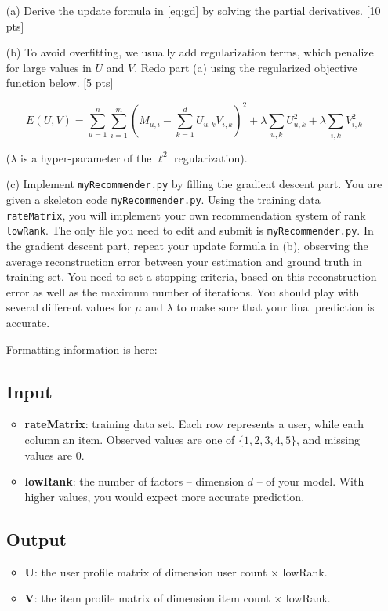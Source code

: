 \documentclass[12pt]{article}
\begin{document}
\begin{itemize}
	\item[(a)] Derive the update formula in \eqref{eq:gd} by
solving the partial derivatives. [10 pts]

\item[(b)] To avoid overfitting, we usually add regularization terms, which penalize for large values in $U$ and $V$.
Redo part (a) using the regularized objective function below. [5
pts]

\begin{equation}
	E(U,V) = \sum_{u=1}^n\sum_{i=1}^m (M_{u,i} - \sum_{k=1}^d U_{u,k}
V_{i,k})^2 + \lambda \sum_{u,k} U_{u,k}^2 + \lambda \sum_{i,k}
V_{i,k}^2 \nonumber
\end{equation}

($\lambda$ is a hyper-parameter of the $\ell^2$ regularization).

\item[(c)] Implement \texttt{myRecommender.py} by filling the gradient descent part.
You are given a skeleton code \texttt{myRecommender.py}. Using the
training data \texttt{rateMatrix}, you will implement your own
recommendation system of rank \texttt{lowRank}. The only file you
need to edit and submit is \texttt{myRecommender.py}. In the gradient descent
part, repeat your update formula in (b), observing the average
reconstruction error between your estimation and ground truth in
training set. You need to set a stopping criteria, based on this
reconstruction error as well as the maximum number of iterations.
You should play with several different values for $\mu$ and
$\lambda$ to make sure that your final prediction is accurate.

Formatting information is here:

\subsection{Input}
\begin{itemize}
  \item \textbf{rateMatrix}: training data set. Each row represents a user, while each column an item.
  Observed values are one of $\{1,2,3,4,5\}$, and missing values are
  0.
  \item \textbf{lowRank}: the number of factors -- dimension $d$ -- of your
  model. With higher values, you would expect more accurate
  prediction.
\end{itemize}

\subsection{Output}
\begin{itemize}
  \item \textbf{U}: the user profile matrix of dimension user count
  $\times$ lowRank.
  \item \textbf{V}: the item profile matrix of dimension item count
  $\times$ lowRank.
\end{itemize}


\end{itemize}
\end{document}
